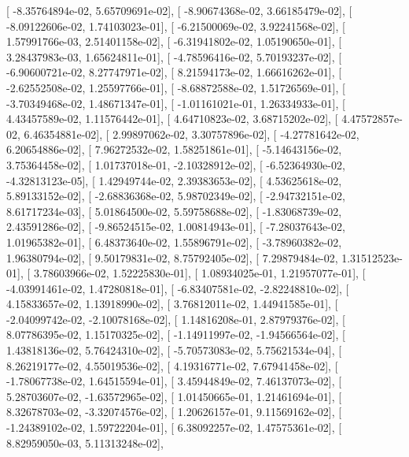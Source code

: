 \documentclass{article}
\begin{document}
       [ -8.35764894e-02,   5.65709691e-02],
       [ -8.90674368e-02,   3.66185479e-02],
       [ -8.09122606e-02,   1.74103023e-01],
       [ -6.21500069e-02,   3.92241568e-02],
       [  1.57991766e-03,   2.51401158e-02],
       [ -6.31941802e-02,   1.05190650e-01],
       [  3.28437983e-03,   1.65624811e-01],
       [ -4.78596416e-02,   5.70193237e-02],
       [ -6.90600721e-02,   8.27747971e-02],
       [  8.21594173e-02,   1.66616262e-01],
       [ -2.62552508e-02,   1.25597766e-01],
       [ -8.68872588e-02,   1.51726569e-01],
       [ -3.70349468e-02,   1.48671347e-01],
       [ -1.01161021e-01,   1.26334933e-01],
       [  4.43457589e-02,   1.11576442e-01],
       [  4.64710823e-02,   3.68715202e-02],
       [  4.47572857e-02,   6.46354881e-02],
       [  2.99897062e-02,   3.30757896e-02],
       [ -4.27781642e-02,   6.20654886e-02],
       [  7.96272532e-02,   1.58251861e-01],
       [ -5.14643156e-02,   3.75364458e-02],
       [  1.01737018e-01,  -2.10328912e-02],
       [ -6.52364930e-02,  -4.32813123e-05],
       [  1.42949744e-02,   2.39383653e-02],
       [  4.53625618e-02,   5.89133152e-02],
       [ -2.68836368e-02,   5.98702349e-02],
       [ -2.94732151e-02,   8.61717234e-03],
       [  5.01864500e-02,   5.59758688e-02],
       [ -1.83068739e-02,   2.43591286e-02],
       [ -9.86524515e-02,   1.00814943e-01],
       [ -7.28037643e-02,   1.01965382e-01],
       [  6.48373640e-02,   1.55896791e-02],
       [ -3.78960382e-02,   1.96380794e-02],
       [  9.50179831e-02,   8.75792405e-02],
       [  7.29879484e-02,   1.31512523e-01],
       [  3.78603966e-02,   1.52225830e-01],
       [  1.08934025e-01,   1.21957077e-01],
       [ -4.03991461e-02,   1.47280818e-01],
       [ -6.83407581e-02,  -2.82248810e-02],
       [  4.15833657e-02,   1.13918990e-02],
       [  3.76812011e-02,   1.44941585e-01],
       [ -2.04099742e-02,  -2.10078168e-02],
       [  1.14816208e-01,   2.87979376e-02],
       [  8.07786395e-02,   1.15170325e-02],
       [ -1.14911997e-02,  -1.94566564e-02],
       [  1.43818136e-02,   5.76424310e-02],
       [ -5.70573083e-02,   5.75621534e-04],
       [  8.26219177e-02,   4.55019536e-02],
       [  4.19316771e-02,   7.67941458e-02],
       [ -1.78067738e-02,   1.64515594e-01],
       [  3.45944849e-02,   7.46137073e-02],
       [  5.28703607e-02,  -1.63572965e-02],
       [  1.01450665e-01,   1.21461694e-01],
       [  8.32678703e-02,  -3.32074576e-02],
       [  1.20626157e-01,   9.11569162e-02],
       [ -1.24389102e-02,   1.59722204e-01],
       [  6.38092257e-02,   1.47575361e-02],
       [  8.82959050e-03,   5.11313248e-02],
\end{document}
